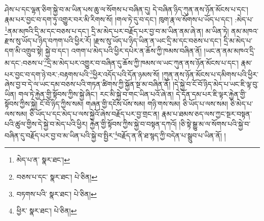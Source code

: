 ཤེས་པ་དང་ལྷན་ཅིག་སྐྱེ་བ་མ་ཡིན་པས་ཆུ་ལ་སོགས་པ་བཞིན་དུ། དེ་བཞིན་ཉིད་ཀུན་ནས་ཉོན་མོངས་པ་དང་། རྣམ་པར་བྱང་བ་དག་ཏུ་འགྱུར་བར་མི་རིགས་སོ། །གལ་ཏེ་དུ་བ་དང་། ཁུག་རྣ་ལ་སོགས་པ་ཡོད་པ་དང་། :མེད་པ་\footnote{མེད་པ་ན་  སྣར་ཐང་། }ནམ་མཁའི་དྲི་མ་དང་བཅས་པ་དང་། དྲི་མ་མེད་པར་བརྗོད་པར་བྱ་བ་མ་ཡིན་ནམ་ཞེ་ན། མ་ཡིན་ཏེ། ནམ་མཁའ་རྫས་སུ་ཡོད་པ་ཉིད་བཀག་པའི་ཕྱིར་རོ། །རྫས་སུ་ཡོད་པ་ཉིད་ཡིན་ན་ཡང་དྲི་མ་དང་བཅས་པ་དང་། དྲི་མ་མེད་པ་དག་མི་འགྲུབ་སྟེ། སྐྱེ་བ་དང་། འགག་པ་མེད་པའི་ཕྱིར་དཔེར་ན་ཆོས་ཀྱི་ཁམས་བཞིན་ནོ། །ཡང་ན་ནམ་མཁའ་དྲི་མ་དང་:བཅས་པ་\footnote{བཅས་པ་དང་  སྣར་ཐང་།  པེ་ཅིན། }དྲི་མ་མེད་པར་འགྱུར་བ་བཞིན་དུ་ཆོས་ཀྱི་ཁམས་ལ་ཡང་ཀུན་ནས་ཉོན་མོངས་པ་དང་། རྣམ་པར་བྱང་བ་དག་ཉེ་བར་:བརྟགས་པའི་\footnote{བཏགས་པའི་  སྣར་ཐང་།  པེ་ཅིན། }ཕྱིར་འདོད་པའི་དོན་ཉམས་སོ། །ཀུན་ནས་ཉོན་མོངས་པ་དམིགས་པའི་ཕྱིར་ཞེས་བྱ་བ་དེ་ལ་ཡང་དམ་བཅས་པའི་གཏན་ཚིགས་ཀྱི་སྐྱོན་སྔ་མ་བཞིན་ནོ། །དེ་སྐྱེ་བ་ངོ་བོ་ཉིད་མེད་པ་ཡང་ཇི་ལྟ་བུ་ཡིན། གལ་ཏེ་རྐྱེན་གྱི་སྟོབས་ཀྱིས་སྐྱེ་ཞིང་། རང་མི་སྐྱེ་བ་གང་ཡིན་པའོ་ཞེ་ན། དེ་དོན་དམ་པར་ཇི་ལྟར་རྐྱེན་གྱི་སྟོབས་ཀྱིས་སྐྱེ། ངོ་བོ་ཉིད་ཀྱིས་སམ། གཞན་གྱི་དངོས་པོས་སམ། གཉི་གས་སམ། ཅི་ཡོད་པ་ལས་སམ། ཅི་མེད་པ་ལས་སམ། ཅི་ཡོད་པ་དང་མེད་པ་ལས་སྐྱེའོ་ཞེས་བརྗོད་པར་བྱ་གྲང་ན། རྣམ་པ་ཐམས་ཅད་ལས་ཀྱང་སྔར་བསྟན་པའི་ཚུལ་གྱིས་དེ་སྐྱེ་བ་མེད་པའི་ཕྱིར། རྐྱེན་གྱི་སྟོབས་ཀྱིས་སྐྱེ་བ་བསྟན་དཀའོ། །ཅི་སྟེ་སྒྱུ་མ་ལ་སོགས་པའི་སྐྱེ་བ་བཞིན་དུ་བརྗོད་པར་བྱ་བ་མ་ཡིན་པའི་སྐྱེ་བ་སྤྱིར་\footnote{ཕྱིར་  སྣར་ཐང་།  པེ་ཅིན། }བརྗོད་ན་ནི་ཐ་སྙད་ཀྱི་བདེན་པ་སྒྲུབ་པ་ཡིན་ནོ། །
